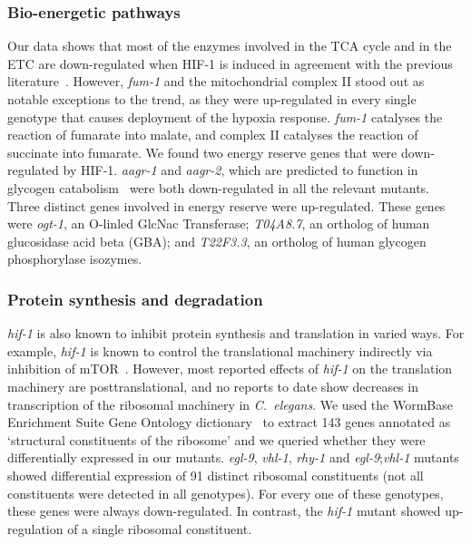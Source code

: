 \documentclass[9pt,twocolumn,twoside]{pnas-new}
\newcommand{\cel}{\emph{C.~elegans}}
\newcommand{\gene}[1]{\emph{#1}}
\newcommand{\egl}{\emph{egl-9}}
\newcommand{\rhy}{\emph{rhy-1}}
\newcommand{\vhl}{\emph{vhl-1}}
\newcommand{\hif}{\emph{hif-1}}
\newcommand{\hifp}{HIF-1}
\begin{document}
\subsubsection{Bio-energetic pathways}
Our data shows that most of the enzymes involved in the TCA cycle and in the ETC
are down-regulated when \hifp{} is induced in agreement with the previous
literature~\cite{Semenza2012}. However,
\gene{fum-1} and the mitochondrial complex II stood out as notable exceptions to
the trend, as they were up-regulated in every single genotype that causes
deployment of the hypoxia response. \gene{fum-1} catalyses the reaction of
fumarate into malate, and complex II catalyses the reaction of succinate into
fumarate.
We found two energy reserve genes that were down-regulated by \hifp{}. \gene{aagr-1}
and \gene{aagr-2}, which are predicted to function in glycogen
catabolism~\cite{Sikora2010} were both down-regulated in all the relevant mutants.
Three distinct genes involved in energy reserve were up-regulated. These genes were
\gene{ogt-1}, an O-linled GlcNac Transferase; \gene{T04A8.7}, an ortholog of human
glucosidase acid beta (GBA); and \gene{T22F3.3}, an ortholog of human glycogen
phosphorylase isozymes.

\subsubsection{Protein synthesis and degradation}

\hif{} is also known to inhibit protein synthesis and translation in varied ways.
For example, \hif{} is known to control the translational machinery indirectly
via inhibition of mTOR~\cite{Brugarolas2004}. However, most reported effects of
\hif{} on the translation machinery are posttranslational, and no reports to date
show decreases in transcription of the ribosomal machinery in \cel{}. We used
the WormBase Enrichment Suite Gene Ontology dictionary~\cite{} to extract 143 genes
annotated as `structural constituents of the ribosome' and we queried whether they
were differentially expressed in our mutants. \egl{}, \vhl{}, \rhy{} and
\egl{};\vhl{} mutants showed differential expression of 91 distinct ribosomal
constituents (not all constituents were detected in all genotypes). For every one
of these genotypes, these genes were always down-regulated. In contrast, the
\hif{} mutant showed up-regulation of a single ribosomal constituent.
\end{document}
